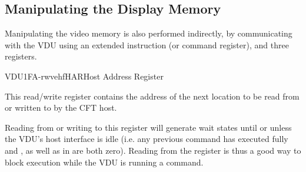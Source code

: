 \subsection{Manipulating the Display Memory}

Manipulating the video memory is also performed indirectly, by communicating
with the VDU using an extended instruction (or command register), and three
registers.

\begin{ioport}{VDU}{1FA}{-rwvehf}{HAR}{Host Address Register}

  This read/write register contains the address of the next location to be read
  from or written to by the CFT host. 

  Reading from or writing to this register will generate wait states until or
  unless the VDU's host interface is idle (i.e. any previous command has
  executed fully and , as well as  in  are both
  zero). Reading from the  register is thus a good way to block
  execution while the VDU is running a command.

  \begin{bitfield}
  \end{bitfield}

\end{ioport}



